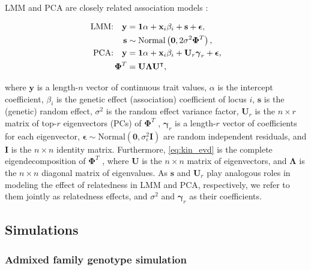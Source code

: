 \documentclass[11pt]{article}
\newcommand{\kinMat}[1][T]{%
  \ensuremath{%
    \mathbf{\Phi}^{#1}
  }%
  \xspace%
}%
\begin{document}
\begin{linenumbers}
LMM and PCA are closely related association models \citep{astle_population_2009, hoffman_correcting_2013, yao_limitations_2022}:
\begin{linenomath*}
\begin{align}
  \label{eq:lmm_gwas}
  \text{LMM:}\quad
  \mathbf{y}
  &=
    \mathbf{1} \alpha + \mathbf{x}_i \beta_i + \mathbf{s} + \boldsymbol{\epsilon}
    , \\
  \label{eq:lmm_rand_eff}
  \mathbf{s}
  &\sim
    \text{Normal} \left( \mathbf{0}, 2 \sigma^2 \kinMat \right), \\
  \label{eq:pca_gwas}
  \text{PCA:}\quad
  \mathbf{y}
  &=
    \mathbf{1} \alpha + \mathbf{x}_i \beta_i + \mathbf{U}_r \boldsymbol{\gamma}_r + \boldsymbol{\epsilon}
    , \\
  \label{eq:kin_evd}
  \kinMat
  &=
    \mathbf{U} \mathbf{\Lambda} \mathbf{U}^\intercal
    ,
\end{align}
\end{linenomath*}
where
$\mathbf{y}$ is a length-$n$ vector of continuous trait values,
$\alpha$ is the intercept coefficient,
$\beta_i$ is the genetic effect (association) coefficient of locus $i$,
$\mathbf{s}$ is the (genetic) random effect,
$\sigma^2$ is the random effect variance factor,
$\mathbf{U}_r$ is the $n \times r$ matrix of top-$r$ eigenvectors (PCs) of \kinMat,
$\boldsymbol{\gamma}_r$ is a length-$r$ vector of coefficients for each eigenvector,
$\boldsymbol{\epsilon} \sim \text{Normal}(\mathbf{0}, \sigma^2_\epsilon \mathbf{I})$ are random independent residuals,
and $\mathbf{I}$ is the $n \times n$ identity matrix.
Furthermore, \cref{eq:kin_evd} is the complete eigendecomposition of \kinMat,
where $\mathbf{U}$ is the $n \times n$ matrix of eigenvectors, and
$\mathbf{\Lambda}$ is the $n \times n$ diagonal matrix of eigenvalues.
As $\mathbf{s}$ and $\mathbf{U}_r$ play analogous roles in modeling the effect of relatedness in LMM and PCA, respectively, we refer to them jointly as relatedness effects, and $\sigma^2$ and $\boldsymbol{\gamma}_r$ as their coefficients.

\subsection{Simulations}

\subsubsection{Admixed family genotype simulation}


\end{linenumbers}
\end{document}
